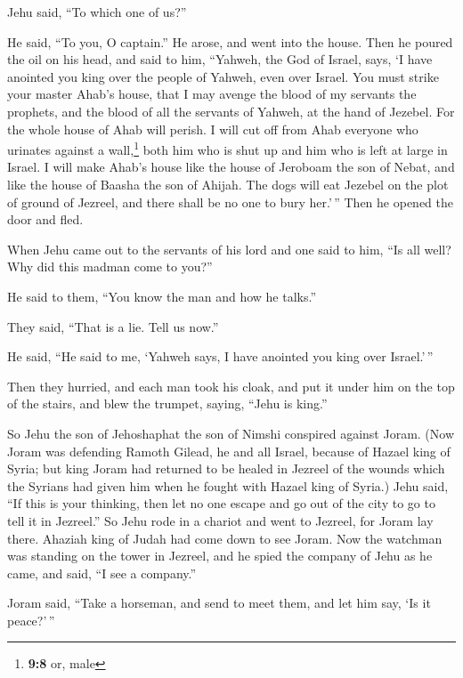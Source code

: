 Jehu said, ``To which one of us?''

He said, ``To you, O captain.''  He arose, and went into
the house. Then he poured the oil on his head, and said to him,
``Yahweh, the God of Israel, says, `I have anointed you king over the
people of Yahweh, even over Israel.  You must strike your
master Ahab's house, that I may avenge the blood of my servants the
prophets, and the blood of all the servants of Yahweh, at the hand of
Jezebel.  For the whole house of Ahab will perish. I will
cut off from Ahab everyone who urinates against a wall,\footnote{\textbf{9:8}
  or, male} both him who is shut up and him who is left at large in
Israel.  I will make Ahab's house like the house of
Jeroboam the son of Nebat, and like the house of Baasha the son of
Ahijah.  The dogs will eat Jezebel on the plot of ground
of Jezreel, and there shall be no one to bury her.'\,'' Then he opened
the door and fled.

 When Jehu came out to the servants of his lord and one
said to him, ``Is all well? Why did this madman come to you?''

He said to them, ``You know the man and how he talks.''

 They said, ``That is a lie. Tell us now.''

He said, ``He said to me, `Yahweh says, I have anointed you king over
Israel.'\,''

 Then they hurried, and each man took his cloak, and put
it under him on the top of the stairs, and blew the trumpet, saying,
``Jehu is king.''

 So Jehu the son of Jehoshaphat the son of Nimshi
conspired against Joram. (Now Joram was defending Ramoth Gilead, he and
all Israel, because of Hazael king of Syria;  but king
Joram had returned to be healed in Jezreel of the wounds which the
Syrians had given him when he fought with Hazael king of Syria.) Jehu
said, ``If this is your thinking, then let no one escape and go out of
the city to go to tell it in Jezreel.''  So Jehu rode in
a chariot and went to Jezreel, for Joram lay there. Ahaziah king of
Judah had come down to see Joram.  Now the watchman was
standing on the tower in Jezreel, and he spied the company of Jehu as he
came, and said, ``I see a company.''

Joram said, ``Take a horseman, and send to meet them, and let him say,
`Is it peace?'\,''

